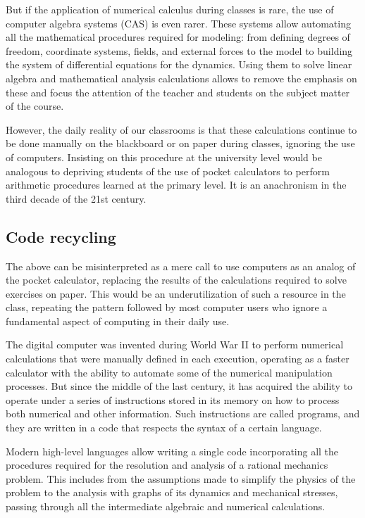 But if the application of numerical calculus during classes is rare, the use of computer algebra systems (CAS) is even rarer. These systems allow automating all the mathematical procedures required for modeling: from defining degrees of freedom, coordinate systems, fields, and external forces to the model to building the system of differential equations for the dynamics. Using them to solve linear algebra and mathematical analysis calculations allows to remove the emphasis on these and focus the attention of the teacher and students on the subject matter of the course.

However, the daily reality of our classrooms is that these calculations continue to be done manually on the blackboard or on paper during classes, ignoring the use of computers. Insisting on this procedure at the university level would be analogous to depriving students of the use of pocket calculators to perform arithmetic procedures learned at the primary level. It is an anachronism in the third decade of the 21st century.

\subsection{Code recycling}

The above can be misinterpreted as a mere call to use computers as an analog of the pocket calculator, replacing the results of the calculations required to solve exercises on paper. This would be an underutilization of such a resource in the class, repeating the pattern followed by most computer users who ignore a fundamental aspect of computing in their daily use.

The digital computer was invented during World War II to perform numerical calculations that were manually defined in each execution, operating as a faster calculator with the ability to automate some of the numerical manipulation processes. But since the middle of the last century, it has acquired the ability to operate under a series of instructions stored in its memory on how to process both numerical and other information. Such instructions are called programs, and they are written in a code that respects the syntax of a certain language.

Modern high-level languages allow writing a single code incorporating all the procedures required for the resolution and analysis of a rational mechanics problem. This includes from the assumptions made to simplify the physics of the problem to the analysis with graphs of its dynamics and mechanical stresses, passing through all the intermediate algebraic and numerical calculations.

